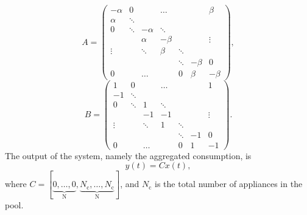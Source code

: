 \documentclass[journal]{IEEEtran}
\begin{document}
{\footnotesize
\begin{displaymath}
A = 
\left( \begin{array} {ccccccc}
-\alpha & 0 & &\ldots &  & & \beta \\
\alpha & \ddots & & & & & \\
0 & \ddots & -\alpha &\ddots &  & & \\
& & \alpha & -\beta &  & &\vdots \\
\vdots& & \ddots& \beta & \ddots & & \\
& & & &\ddots & -\beta & 0 \\
0 & &\ldots & & 0& \beta &-\beta
\end{array} \right),
\end{displaymath}
\begin{displaymath}
B = 
\left( \begin{array} {ccccccc}
1 & 0 & &\ldots &  & & 1 \\
-1 & \ddots & & & & & \\
0 & \ddots & 1 &\ddots &  & & \\
& & -1 & -1 &  & &\vdots \\
\vdots& & \ddots& 1 & \ddots & & \\
& & & &\ddots & -1 & 0 \\
0 & &\ldots & & 0& 1 &-1
\end{array} \right).
\end{displaymath}
}
The output of the system, namely the aggregated consumption, is
\begin{equation}
\label{main output}
y(t)=Cx(t),
\end{equation}
where $C=[\underbrace{0,\ldots,0}_{\textrm{N}},\underbrace{N_{\textrm{c}},\ldots,N_{\textrm{c}}}_{\textrm{N}}]$, and $N_{\textrm{c}}$ is the total number of appliances in the pool.
\end{document}
